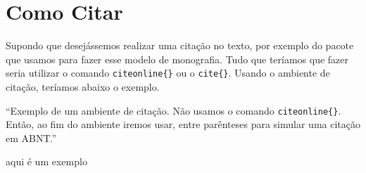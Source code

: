 
\chapter{Como Citar}
\label{cap:cite}

Supondo que desejássemos realizar uma citação no texto, por exemplo do pacote que usamos para fazer esse modelo de monografia. Tudo que teríamos que fazer seria utilizar o comando \texttt{citeonline\{\}} ou o \texttt{cite\{\}}. Usando o ambiente de citação, teríamos abaixo o exemplo.\cite{osbourne2009ozzy}

\begin{citacao}
	``Exemplo de um ambiente de citação. Não usamos o comando \texttt{citeonline\{\}}. Então, ao fim do ambiente iremos usar, entre parênteses para simular uma citação em ABNT.'' \cite[p.56]{osbourne2009ozzy}
\end{citacao}

aqui é um exemplo 

